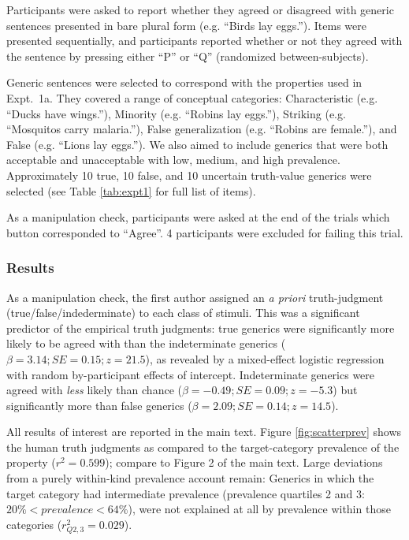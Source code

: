 \documentclass[10pt,letterpaper]{article}
\begin{document}
Participants were asked to report whether they agreed or disagreed with generic sentences presented in bare plural form (e.g. ``Birds lay eggs.''). 
Items were presented sequentially, and participants reported whether or not they agreed with the sentence by pressing either ``P'' or ``Q'' (randomized between-subjects). 

Generic sentences were selected to correspond with the properties used in Expt.~1a. 
They covered a range of conceptual categories: Characteristic (e.g. ``Ducks have wings.''), Minority (e.g. ``Robins lay eggs.''), Striking (e.g. ``Mosquitos carry malaria.''), False generalization (e.g. ``Robins are female.''), and False (e.g. ``Lions lay eggs.'').
We also aimed to include generics that were both acceptable and unacceptable with low, medium, and high prevalence.
Approximately 10 true, 10 false, and 10 uncertain truth-value generics were selected (see Table \ref{tab:expt1} for full list of items).

As a manipulation check, participants were asked at the end of the trials which button corresponded to ``Agree''. 4 participants were excluded for failing this trial.

\subsubsection{Results}

As a manipulation check, the first author assigned an \emph{a priori} truth-judgment (true/false/indederminate) to each class of stimuli. This was a significant predictor of the empirical truth judgments: true generics were significantly more likely to be agreed with than the indeterminate generics ($\beta = 3.14; SE = 0.15; z = 21.5$), as revealed by a mixed-effect logistic regression with random by-participant effects of intercept.
Indeterminate generics were agreed with \emph{less} likely than chance ($\beta = -0.49; SE = 0.09; z = -5.3$) but significantly more than false generics ($\beta = 2.09; SE = 0.14; z = 14.5$).


All results of interest are reported in the main text.
 Figure \ref{fig:scatterprev} shows the human truth judgments as compared to the target-category prevalence of the property ($r^2 = 0.599$); compare to Figure 2 of the main text.
 Large deviations from a purely within-kind prevalence account remain: 
 Generics in which the target category had intermediate prevalence (prevalence quartiles 2 and 3: $ 20\% < prevalence < 64\%$), were not explained at all by prevalence within those categories ($r_{Q2,3}^2 = 0.029$).
\end{document}
